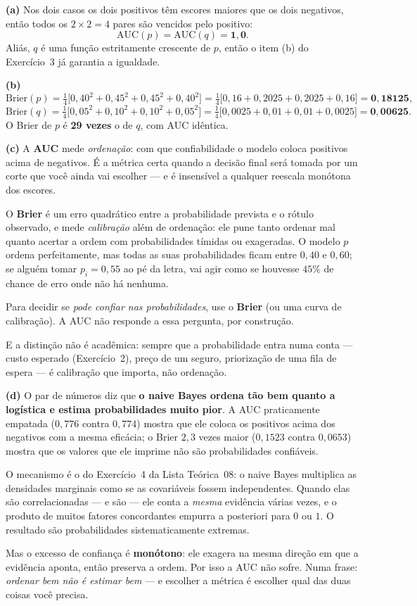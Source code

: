 \documentclass[11pt,a4paper]{article}
\begin{document}
\begin{solucao}
\textbf{(a)} Nos dois casos os dois positivos têm escores maiores que os dois
negativos, então todos os $2\times2=4$ pares são vencidos pelo positivo:
\[
  \mathrm{AUC}(p) = \mathrm{AUC}(q) = \mathbf{1{,}0}.
\]
Aliás, $q$ é uma função estritamente crescente de $p$, então o item (b) do
Exercício~3 já garantia a igualdade.

\smallskip
\textbf{(b)}
\[
  \mathrm{Brier}(p) = \tfrac14\big[0{,}40^2+0{,}45^2+0{,}45^2+0{,}40^2\big]
   = \tfrac14\big[0{,}16+0{,}2025+0{,}2025+0{,}16\big] = \mathbf{0{,}18125},
\]
\[
  \mathrm{Brier}(q) = \tfrac14\big[0{,}05^2+0{,}10^2+0{,}10^2+0{,}05^2\big]
   = \tfrac14\big[0{,}0025+0{,}01+0{,}01+0{,}0025\big] = \mathbf{0{,}00625}.
\]
O Brier de $p$ é \textbf{29 vezes} o de $q$, com AUC idêntica.

\smallskip
\textbf{(c)} A \textbf{AUC} mede \emph{ordenação}: com que confiabilidade o modelo
coloca positivos acima de negativos. É a métrica certa quando a decisão final
será tomada por um corte que você ainda vai escolher --- e é insensível a
qualquer reescala monótona dos escores.

O \textbf{Brier} é um erro quadrático entre a probabilidade prevista e o rótulo
observado, e mede \emph{calibração} além de ordenação: ele pune tanto ordenar mal
quanto acertar a ordem com probabilidades tímidas ou exageradas. O modelo $p$
ordena perfeitamente, mas todas as suas probabilidades ficam entre $0{,}40$ e
$0{,}60$; se alguém tomar $p_i=0{,}55$ ao pé da letra, vai agir como se houvesse
$45\%$ de chance de erro onde não há nenhuma.

Para decidir se \emph{pode confiar nas probabilidades}, use o \textbf{Brier} (ou
uma curva de calibração). A AUC não responde a essa pergunta, por construção.

E a distinção não é acadêmica: sempre que a probabilidade entra numa conta ---
custo esperado (Exercício~2), preço de um seguro, priorização de uma fila de
espera --- é calibração que importa, não ordenação.

\smallskip
\textbf{(d)} O par de números diz que \textbf{o naive Bayes ordena tão bem quanto
a logística e estima probabilidades muito pior}. A AUC praticamente empatada
($0{,}776$ contra $0{,}774$) mostra que ele coloca os positivos acima dos
negativos com a mesma eficácia; o Brier $2{,}3$ vezes maior ($0{,}1523$ contra
$0{,}0653$) mostra que os valores que ele imprime não são probabilidades
confiáveis.

O mecanismo é o do Exercício~4 da Lista Teórica~08: o naive Bayes multiplica as
densidades marginais como se as covariáveis fossem independentes. Quando elas são
correlacionadas --- e são --- ele conta a \emph{mesma} evidência várias vezes, e
o produto de muitos fatores concordantes empurra a posteriori para $0$ ou $1$. O
resultado são probabilidades sistematicamente extremas.

Mas o excesso de confiança é \textbf{monótono}: ele exagera na mesma direção em
que a evidência aponta, então preserva a ordem. Por isso a AUC não sofre. Numa
frase: \emph{ordenar bem não é estimar bem} --- e escolher a métrica é escolher
qual das duas coisas você precisa.
\end{solucao}
\end{document}
